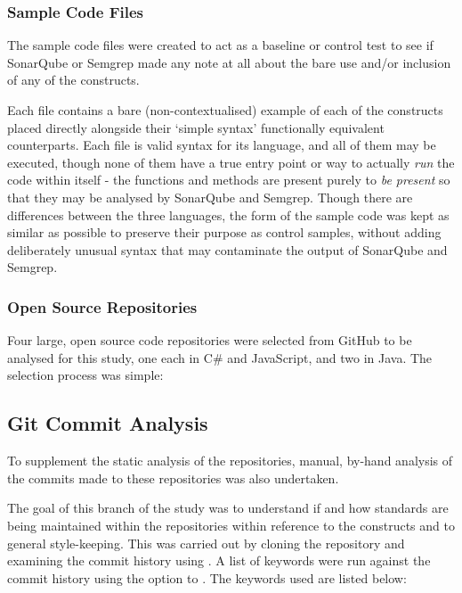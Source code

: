 \documentclass{article}
\begin{document}
        \subsubsection{Sample Code Files}
            The sample code files were created to act as a baseline or control test to see if SonarQube or Semgrep made any note at all about the bare use and/or inclusion of any of the constructs.

            Each file contains a bare (non-contextualised) example of each of the constructs placed directly alongside their `simple syntax' functionally equivalent counterparts. Each file is valid syntax for its language, and all of them may be executed, though none of them have a true entry point or way to actually \emph{run} the code within itself - the functions and methods are present purely to \emph{be present} so that they may be analysed by SonarQube and Semgrep. Though there are differences between the three languages, the form of the sample code was kept as similar as possible to preserve their purpose as control samples, without adding deliberately unusual syntax that may contaminate the output of SonarQube and Semgrep.
        \subsubsection{Open Source Repositories}
            Four large, open source code repositories were selected from GitHub to be analysed for this study, one each in C\# and JavaScript, and two in Java. The selection process was simple: 
    \subsection{Git Commit Analysis}
        To supplement the static analysis of the repositories, manual, by-hand analysis of the commits made to these repositories was also undertaken.

        The goal of this branch of the study was to understand if and how standards are being maintained within the repositories within reference to the constructs and to general style-keeping. This was carried out by cloning the repository and examining the commit history using . A list of keywords were run against the commit history using the  option to . The keywords used are listed below:
        
\end{document}
